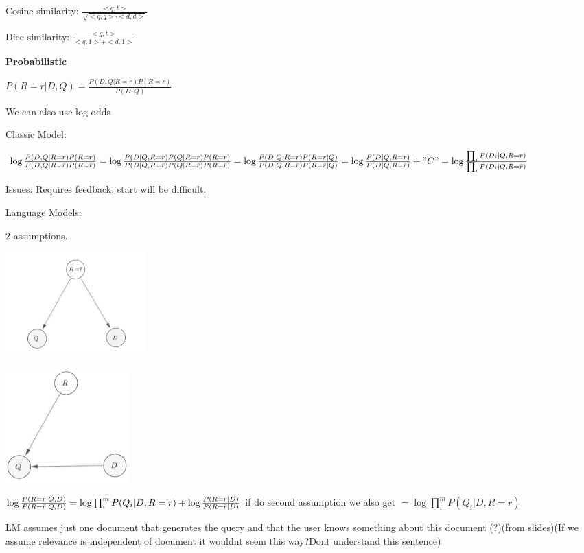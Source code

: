\documentclass[a4paper,10pt,landscape]{article}
\begin{document}
\begin{multicols}{3}
\begin{center}
Cosine similarity: $\frac{<q,t>}{\sqrt{<q,q>\cdot<d,d>}}$

Dice similarity:  $\frac{<q,t>}{<q,1>+<d,1>}$

\textbf{Probabilistic}


$P(R=r|D,Q) = \frac{P(D,Q|R=r)P(R=r)}{P(D,Q)}$

We can also use log odds

Classic Model:

$\log\frac{P(D,Q|R=r)P(R=r)}{P(D,Q|R=\Bar{r})P(R=\Bar{r})} = 
\log\frac{P(D|Q,R=r)P(Q|R=r)P(R=r)}{P(D|Q,R=\Bar{r})P(Q|R=\Bar{r})P(R=\Bar{r})} = \log\frac{P(D|Q,R=r)P(R=r|Q)}{P(D|Q,R=\Bar{r})P(R=\Bar{r}|Q)} = \log\frac{P(D|Q,R=r)}{P(D|Q,R=\Bar{r})}+"C" = \log\frac{\prod_iP(D_i|Q,R=r)}{\prod_iP(D_i|Q,R=\Bar{r})}$

Issues: Requires feedback, start will be difficult.

Language Models:

2 assumptions.

\includegraphics[width=.5\linewidth]{images/LMQD.png}

\includegraphics[width=.5\linewidth]{images/LMDR.png}

$\log\frac{P(R=r|Q,D)}{P(R=\Bar{r}|Q,D)} = \log\prod_i^mP(Q_i|D,R=r)+\log\frac{P(R=r|D)}{P(R=\Bar{r}|D)}$ if do second assumption we also get $= \log\prod_i^mP(Q_i|D,R=r)$

LM assumes just one document that generates the query and that the user knows something about this document (?)(from slides)(If we assume relevance is independent of document it wouldnt seem this way?Dont understand this sentence)



\end{center}
\end{multicols}
\end{document}
